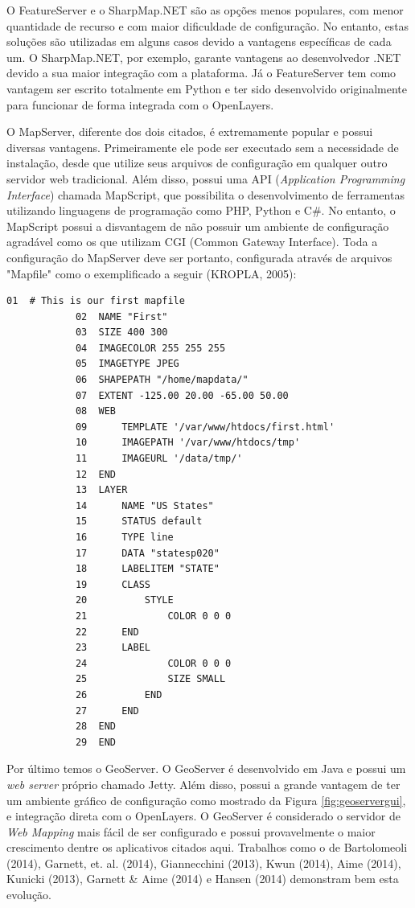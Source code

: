 		O FeatureServer e o SharpMap.NET são as opções menos populares, com menor quantidade de recurso e com maior dificuldade de configuração. No entanto, estas soluções são utilizadas em alguns casos devido a vantagens específicas de cada um. O SharpMap.NET, por exemplo, garante vantagens ao desenvolvedor .NET devido a sua maior integração com a plataforma. Já o FeatureServer tem como vantagem ser escrito totalmente em Python e ter sido desenvolvido originalmente para funcionar de forma integrada com o OpenLayers. 
		
		O MapServer, diferente dos dois citados, é extremamente popular e possui diversas vantagens. Primeiramente ele pode ser executado sem a necessidade de instalação, desde que utilize seus arquivos de configuração em qualquer outro servidor web tradicional. Além disso, possui uma API (\textit{Application Programming Interface}) chamada MapScript, que possibilita o desenvolvimento de ferramentas utilizando linguagens de programação como PHP, Python e C\#. No entanto, o MapScript possui a disvantagem de não possuir um ambiente de configuração agradável como os que utilizam CGI (Common Gateway Interface). Toda a configuração do MapServer deve ser portanto, configurada através de arquivos "Mapfile" como o exemplificado a seguir (KROPLA, 2005)\cite{KROPLA}: 
		
		\begin{lstlisting}[float,floatplacement=H]
			01  # This is our first mapfile
			02  NAME "First"
			03  SIZE 400 300
			04  IMAGECOLOR 255 255 255
			05  IMAGETYPE JPEG
			06  SHAPEPATH "/home/mapdata/"
			07  EXTENT -125.00 20.00 -65.00 50.00
			08  WEB
			09      TEMPLATE '/var/www/htdocs/first.html'
			10      IMAGEPATH '/var/www/htdocs/tmp'
			11      IMAGEURL '/data/tmp/'
			12  END
			13  LAYER
			14      NAME "US States"
			15      STATUS default
			16      TYPE line
			17      DATA "statesp020"
			18      LABELITEM "STATE"
			19      CLASS
			20          STYLE
			21              COLOR 0 0 0
			22      END
			23      LABEL
			24              COLOR 0 0 0
			25              SIZE SMALL
			26          END
			27      END
			28  END
			29  END
		\end{lstlisting}
		
		Por último temos o GeoServer. O GeoServer é desenvolvido em Java e possui um \textit{web server} próprio chamado Jetty. Além disso, possui a grande vantagem de ter um ambiente gráfico de configuração como mostrado da Figura \ref{fig:geoservergui}, e integração direta com o OpenLayers. O GeoServer é considerado o servidor de \textit{Web Mapping} mais fácil de ser configurado e possui provavelmente o maior crescimento dentre os aplicativos citados aqui. Trabalhos como o de Bartolomeoli (2014)\cite{BARTOLOMEOLI}, Garnett, et. al. (2014)\cite{GARNETT_etal15}, Giannecchini (2013)\cite{GIANNECCHINI}, Kwun (2014)\cite{KWUN}, Aime (2014)\cite{AIME}, Kunicki (2013)\cite{KUNICKI}, Garnett \& Aime (2014)\cite{GARNETT_AIME} e Hansen (2014)\cite{HANSEN} demonstram bem esta evolução.
		

